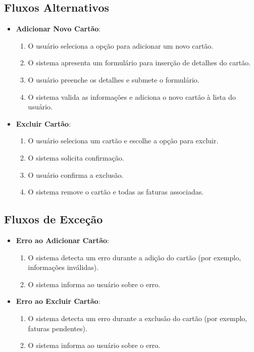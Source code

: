 \subsection*{Fluxos Alternativos}
\begin{addmargin}[1.5cm]{0cm}
    \begin{itemize}
        \item \textbf{Adicionar Novo Cartão}:
        \begin{enumerate}
            \item O usuário seleciona a opção para adicionar um novo cartão.
            \item O sistema apresenta um formulário para inserção de detalhes do cartão.
            \item O usuário preenche os detalhes e submete o formulário.
            \item O sistema valida as informações e adiciona o novo cartão à lista do usuário.
        \end{enumerate}
        
        \item \textbf{Excluir Cartão}:
        \begin{enumerate}
            \item O usuário seleciona um cartão e escolhe a opção para excluir.
            \item O sistema solicita confirmação.
            \item O usuário confirma a exclusão.
            \item O sistema remove o cartão e todas as faturas associadas.
        \end{enumerate}
    \end{itemize}
\end{addmargin}

\subsection*{Fluxos de Exceção}
\begin{addmargin}[1.5cm]{0cm}
    \begin{itemize}
        \item \textbf{Erro ao Adicionar Cartão}:
        \begin{enumerate}
            \item O sistema detecta um erro durante a adição do cartão (por exemplo, informações inválidas).
            \item O sistema informa ao usuário sobre o erro.
        \end{enumerate}
        
        \item \textbf{Erro ao Excluir Cartão}:
        \begin{enumerate}
            \item O sistema detecta um erro durante a exclusão do cartão (por exemplo, faturas pendentes).
            \item O sistema informa ao usuário sobre o erro.
        \end{enumerate}
    \end{itemize}
\end{addmargin}

